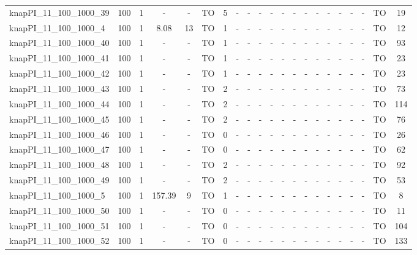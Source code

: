 \begin{sidewaystable}[!ht]
{\begin{tabular}{lcccccccccccccccccccc}
knapPI\_11\_100\_1000\_39 & 100 & 1 &  - &  - & TO & 5 &  - &  - &  - &  - &  - &  - &  - &  - &  - &  - &  - &  - & TO & 19 \\
knapPI\_11\_100\_1000\_4 & 100 & 1 &  \textcolor{blue2}{8.08} & 13 & TO & 1 &  - &  - &  - &  - &  - &  - &  - &  - &  - &  - &  - &  - & TO & 12 \\
knapPI\_11\_100\_1000\_40 & 100 & 1 &  - &  - & TO & 1 &  - &  - &  - &  - &  - &  - &  - &  - &  - &  - &  - &  - & TO & 93 \\
knapPI\_11\_100\_1000\_41 & 100 & 1 &  - &  - & TO & 1 &  - &  - &  - &  - &  - &  - &  - &  - &  - &  - &  - &  - & TO & 23 \\
knapPI\_11\_100\_1000\_42 & 100 & 1 &  - &  - & TO & 1 &  - &  - &  - &  - &  - &  - &  - &  - &  - &  - &  - &  - & TO & 23 \\
knapPI\_11\_100\_1000\_43 & 100 & 1 &  - &  - & TO & 2 &  - &  - &  - &  - &  - &  - &  - &  - &  - &  - &  - &  - & TO & 73 \\
knapPI\_11\_100\_1000\_44 & 100 & 1 &  - &  - & TO & 2 &  - &  - &  - &  - &  - &  - &  - &  - &  - &  - &  - &  - & TO & 114 \\
knapPI\_11\_100\_1000\_45 & 100 & 1 &  - &  - & TO & 2 &  - &  - &  - &  - &  - &  - &  - &  - &  - &  - &  - &  - & TO & 76 \\
knapPI\_11\_100\_1000\_46 & 100 & 1 &  - &  - & TO & 0 &  - &  - &  - &  - &  - &  - &  - &  - &  - &  - &  - &  - & TO & 26 \\
knapPI\_11\_100\_1000\_47 & 100 & 1 &  - &  - & TO & 0 &  - &  - &  - &  - &  - &  - &  - &  - &  - &  - &  - &  - & TO & 62 \\
knapPI\_11\_100\_1000\_48 & 100 & 1 &  - &  - & TO & 2 &  - &  - &  - &  - &  - &  - &  - &  - &  - &  - &  - &  - & TO & 92 \\
knapPI\_11\_100\_1000\_49 & 100 & 1 &  - &  - & TO & 2 &  - &  - &  - &  - &  - &  - &  - &  - &  - &  - &  - &  - & TO & 53 \\
knapPI\_11\_100\_1000\_5 & 100 & 1 &  \textcolor{blue2}{157.39} & 9 & TO & 1 &  - &  - &  - &  - &  - &  - &  - &  - &  - &  - &  - &  - & TO & 8 \\
knapPI\_11\_100\_1000\_50 & 100 & 1 &  - &  - & TO & 0 &  - &  - &  - &  - &  - &  - &  - &  - &  - &  - &  - &  - & TO & 11 \\
knapPI\_11\_100\_1000\_51 & 100 & 1 &  - &  - & TO & 0 &  - &  - &  - &  - &  - &  - &  - &  - &  - &  - &  - &  - & TO & 104 \\
knapPI\_11\_100\_1000\_52 & 100 & 1 &  - &  - & TO & 0 &  - &  - &  - &  - &  - &  - &  - &  - &  - &  - &  - &  - & TO & 133 \\

\end{tabular}}
\end{sidewaystable}

